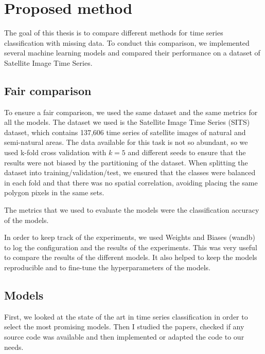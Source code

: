 \section{Proposed method}
The goal of this thesis is to compare different methods for time series classification with missing data.
To conduct this comparison, we implemented several machine learning models and compared their performance on a dataset of Satellite Image Time Series.

\subsection{Fair comparison}
To ensure a fair comparison, we used the same dataset and the same metrics for all the models.
The dataset we used is the Satellite Image Time Series (SITS) dataset, which contains 137,606 time series of satellite images of natural and semi-natural areas. 
The data available for this task is not so abundant, so we used k-fold cross validation with $k=5$ and different seeds to ensure that the results were not biased by the partitioning of the dataset.
When splitting the dataset into training/validation/test, we ensured that the classes were balanced in each fold and that there was no spatial correlation, avoiding placing the same polygon pixels in the same sets.

The metrics that we used to evaluate the models were the classification accuracy of the models.

In order to keep track of the experiments, we used Weights and Biases (wandb) to log the configuration and the results of the experiments.
This was very useful to compare the results of the different models. It also helped to keep the models reproducible and to fine-tune the hyperparameters of the models.

\subsection{Models}
First, we looked at the state of the art in time series classification in order to select the most promising models.
Then I studied the papers, checked if any source code was available and then implemented or adapted the code to our needs.

